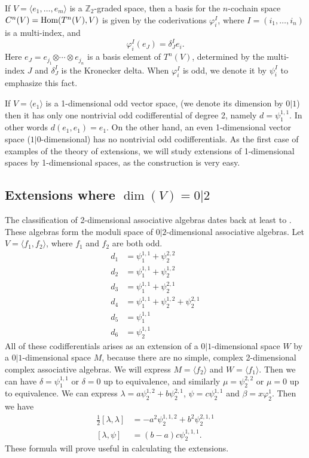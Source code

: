 \documentclass[12pt]{amsart}
\theoremstyle{definition}
\begin{document}
If $V=\langle e_1,\ldots, e_m\rangle$ is a {\mbox{${\mbox{$\mathbb Z$}}_2$}}-graded space, then a
basis for the $n$-cochain space $C^n(V)={\mbox{\rm Hom}}(T^n(V),V)$ is given by
the coderivations ${\varphi}^I_i$, where $I=(i_1,\ldots,i_n)$ is a
multi-index, and
\begin{equation*}
{\varphi}^I_i(e_J)=\delta^I_Je_i.
\end{equation*}
Here $e_J=e_{j_1}{{\otimes}\cdots{\otimes}} e_{j_n}$ is a basis element of $T^n(V)$,
determined by the multi-index $J$
and $\delta^I_J$ is the Kronecker delta. When ${\varphi}^I_i$ is odd, we
denote it by $\psi^I_i$ to emphasize this fact.

If $V=\langle e_1\rangle$ is a 1-dimensional odd vector space, (we
denote its dimension by $0|1$) then it has only one nontrivial odd
codifferential of degree 2, namely $d=\psi^{1,1}_1$. In other words
$d(e_1,e_1)=e_1$. On the other hand, an even 1-dimensional vector space
($1|0$-dimensional) has no nontrivial odd codifferentials. As the first
case of examples of the theory of extensions, we will study extensions
of 1-dimensional spaces by 1-dimensional spaces, as the construction is
very easy.

\subsection{Extensions where $\dim(V)=0|2$}
The classification of 2-di\-men\-sional asso\-ciative algebras dates
back at least to \cite{pie}. These algebras form the moduli space of
$0|2$-dimensional associative algebras. Let $V=\langle f_1,f_2\rangle$,
where $f_1$ and $f_2$ are both odd.
\begin{align*}
d_1&={\psi^{{1,1}}_{1}}+{\psi^{{2,2}}_{2}}\\
d_2&={\psi^{{1,1}}_{1}}+{\psi^{{1,2}}_{2}}\\
d_3&={\psi^{{1,1}}_{1}}+{\psi^{{2,1}}_{2}}\\
d_4&={\psi^{{1,1}}_{1}}+{\psi^{{1,2}}_{2}}+{\psi^{{2,1}}_{2}}\\
d_5&={\psi^{{1,1}}_{1}}\\
d_6&={\psi^{{1,1}}_{2}}
\end{align*}
All of these codifferentials arises as an extension of a
$0|1$-dimensional space $W$ by a $0|1$-dimensional space $M$,
because there are no simple, complex 2-dimensional complex
associative algebras. We will express $M=\langle f_2\rangle$ and
$W=\langle f_1\rangle$. Then we can have $\delta={\psi^{{1,1}}_{1}}$ or
$\delta=0$ up to equivalence, and similarly $\mu={\psi^{{2,2}}_{2}}$ or
$\mu=0$ up to equivalence. We can express
$\lambda=a{\psi^{{1,2}}_{2}}+b{\psi^{{2,1}}_{2}}$, $\psi=c{\psi^{{1,1}}_{2}}$ and
$\beta=x{{\varphi}^{1}_{2}}$. Then we have
\begin{align*}
\tfrac12[\lambda,\lambda]&=-a^2{\psi^{{1,1,2}}_{2}}+b^2{\psi^{{2,1,1}}_{2}}\\
[\lambda,\psi]&=(b-a)c{\psi^{{1,1,1}}_{2}}.
\end{align*}
These formula will prove useful in calculating the extensions.
\end{document}
